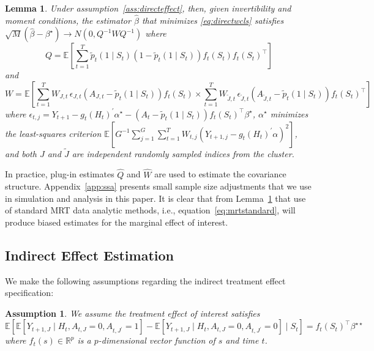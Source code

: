 \documentclass[12pt]{article}
\def\E{\mathbb{E}}
\newtheorem{lemma}[thm]{Lemma}
\newtheorem{assumption}[thm]{Assumption}
\newcommand{\zw}[1]{\textcolor{blue}{[\textit{ZW: #1}]}}
\begin{document}
\begin{lemma}
\label{lemma:asymnorm}
Under assumption~\ref{ass:directeffect}, then, given invertibility and moment conditions, the estimator $\hat \beta$ that minimizes \eqref{eq:directwcls} satisfies $\sqrt{M} \left(\hat \beta - \beta^\star \right) \to N(0, Q^{-1} W Q^{-1})$ where
$$
Q = \mathbb{E} \left[ \sum_{t=1}^T \tilde p_t( 1 \mid S_{t} ) ( 1- \tilde p_t( 1 \mid S_{t} )) f_t (S_t) f_t (S_t)^\top \right]
$$
and
$$
W =  \mathbb{E} \left[ \sum_{t=1}^T W_{J,t} \, \epsilon_{J,t} ( A_{J,t} - \tilde p_t( 1 \mid S_{t} )) f_t (S_t) \times \sum_{t=1}^T W_{\tilde J,t} \, \epsilon_{\tilde J,t} ( A_{\tilde J,t} - \tilde p_t( 1 \mid S_{t} )) f_t (S_t)^\top  \right]
$$
where $\epsilon_{t,j} = Y_{t+1} - g_t(H_t)^\prime \alpha^\star - (A_t - \tilde p_t (1 \mid S_t) ) f_t (S_t)^\top \beta^\star$, $\alpha^\star$ minimizes the least-squares criterion $\mathbb{E}  \left[G^{-1} \sum_{j=1}^G \sum_{t=1}^T W_{t,j} \left( Y_{t+1,j} - g_t(H_t)^\prime \alpha \right)^2 \right]$, and both $J$ and $\tilde J$ are independent randomly sampled indices from the cluster.
\end{lemma}

\noindent In practice, plug-in estimates $\hat Q$ and $\hat W$ are used to estimate the covariance structure. Appendix~\ref{app:ssa} presents small sample size adjustments that we use in simulation and analysis in this paper.  It is clear that from Lemma~\ref{lemma:asymnorm} that use of standard MRT data analytic methods, i.e., equation~\eqref{eq:mrtstandard}, will produce biased estimates for the marginal effect of interest.

\subsection{Indirect Effect Estimation}
\label{section:indirect}

We make the following assumptions regarding the indirect treatment effect specification:

\begin{assumption} \normalfont
\label{ass:indirecteffect}
We assume the treatment effect of interest satisfies
$$
\E \left[ \E \left[ Y_{t+1, J} \mid H_t, A_{t,J} = 0, A_{t,J^\prime} = 1 \right] - \E \left[ Y_{t+1, J} \mid H_t, A_{t,J} = 0, A_{t,J^\prime} = 0 \right] \mid S_t \right] = f_t (S_t)^\top \beta^{\star \star}
$$
where $f_t (s) \in \mathbb{R}^p$ is a $p$-dimensional vector function of $s$ and time $t$.
\end{assumption}
\end{document}
